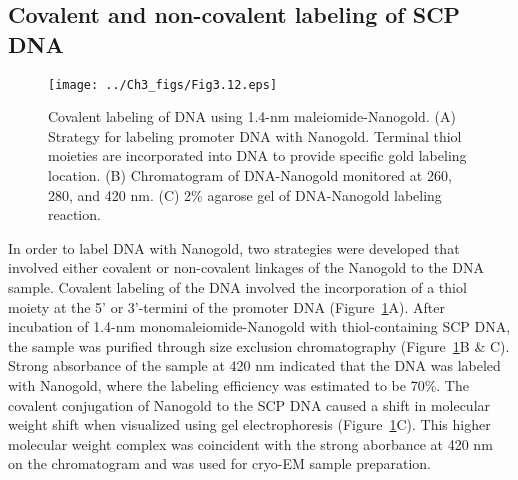 \subsection{Covalent and non-covalent labeling of SCP DNA}
\begin{figure}
\centering
\texttt{[image: ../Ch3\_figs/Fig3.12.eps]}
\caption[Covalent labeling of DNA using 1.4-nm maleiomide-Nanogold]{Covalent labeling of DNA using 1.4-nm maleiomide-Nanogold. (A) Strategy for labeling promoter DNA with Nanogold. Terminal thiol moieties are incorporated into DNA to provide specific gold labeling location. (B) Chromatogram of DNA-Nanogold monitored at 260, 280, and 420 nm. (C) 2\% agarose gel of DNA-Nanogold labeling reaction.}
\label{fig:Fig3.12}
\end{figure}
In order to label DNA with Nanogold, two strategies were developed that involved either covalent or non-covalent linkages of the Nanogold to the DNA sample. Covalent labeling of the DNA involved the incorporation of a thiol moiety at the 5' or 3'-termini of the promoter DNA (Figure~\ref{fig:Fig3.12}A). After incubation of 1.4-nm monomaleiomide-Nanogold with thiol-containing SCP DNA, the sample was purified through size exclusion chromatography (Figure~\ref{fig:Fig3.12}B \& C). Strong absorbance of the sample at 420 nm indicated that the DNA was labeled with Nanogold, where the labeling efficiency was estimated to be 70\%. The covalent conjugation of Nanogold to the SCP DNA caused a shift in molecular weight shift when visualized using gel electrophoresis (Figure~\ref{fig:Fig3.12}C). This higher molecular weight complex was coincident with the strong aborbance at 420 nm on the chromatogram and was used for cryo-EM sample preparation.\\
